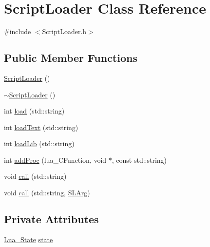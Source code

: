 \hypertarget{classScriptLoader}{\section{\-Script\-Loader \-Class \-Reference}
\label{classScriptLoader}
}


{\ttfamily \#include $<$\-Script\-Loader.\-h$>$}

\subsection*{\-Public \-Member \-Functions}
\begin{DoxyCompactItemize}
\item 
\hyperlink{classScriptLoader_a78a02f536324e70296d2a3145422a995}{\-Script\-Loader} ()
\item 
\hyperlink{classScriptLoader_a27ee182ec99bae44d69c0f4395a74627}{$\sim$\-Script\-Loader} ()
\item 
int \hyperlink{classScriptLoader_a9086035942d48d0e2e3f27adf6e64610}{load} (std\-::string)
\item 
int \hyperlink{classScriptLoader_ad6d0c9a988d5672ba4e7dd6c21b42087}{load\-Text} (std\-::string)
\item 
int \hyperlink{classScriptLoader_a7ca17e7aed24fc73154558b79fe6230c}{load\-Lib} (std\-::string)
\item 
int \hyperlink{classScriptLoader_aeed89cb2b229db62e45a0a546fe97802}{add\-Proc} (lua\-\_\-\-C\-Function, void $\ast$, const std\-::string)
\item 
void \hyperlink{classScriptLoader_a96305ed715530eff1b5f5b82f324dbe2}{call} (std\-::string)
\item 
void \hyperlink{classScriptLoader_aa776dfca1106ee9f713850eacabe8a13}{call} (std\-::string, \hyperlink{ScriptLoader_8h_a46a39c227bfcf3a06bd727417f54feef}{\-S\-L\-Arg})
\end{DoxyCompactItemize}
\subsection*{\-Private \-Attributes}
\begin{DoxyCompactItemize}
\item 
\hyperlink{classLua__State}{\-Lua\-\_\-\-State} \hyperlink{classScriptLoader_a2c3fcbd1aa0d7db987b51d1c68e02c06}{state}
\end{DoxyCompactItemize}


